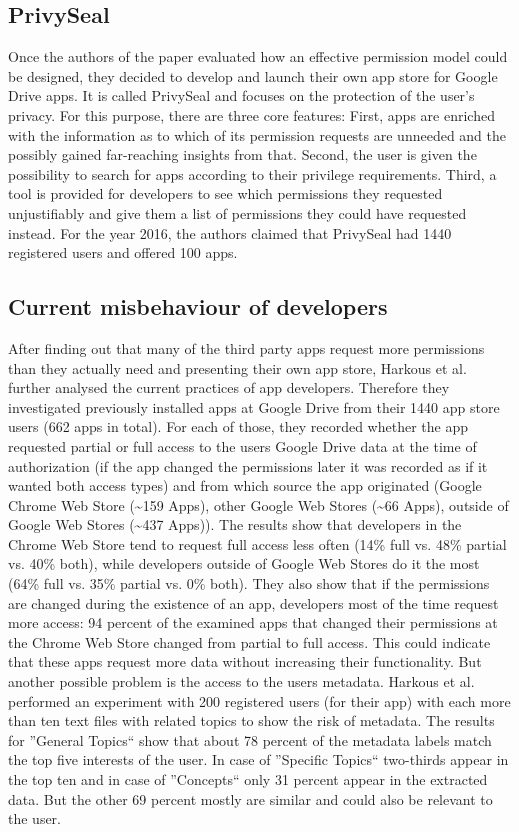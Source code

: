 \documentclass[11pt,twocolumn,a4paper,DIV=calc]{scrartcl}
\begin{document}
\subsection{PrivySeal} 
Once the authors of the paper evaluated how an effective permission model could be designed, they decided to develop and launch their own app store for Google Drive apps. It is called PrivySeal and focuses on the protection of the user's privacy. For this purpose, there are three core features: First, apps are enriched with the information as to which of its permission requests are unneeded and the possibly gained far-reaching insights from that. Second, the user is given the possibility to search for apps according to their privilege requirements. Third, a tool is provided for developers to see which permissions they requested unjustifiably and give them a list of permissions they could have requested instead. For the year 2016, the authors claimed that PrivySeal had 1440 registered users and offered 100 apps. 
\subsection{Current misbehaviour of developers}
After finding out that many of the third party apps request more permissions than they actually need and presenting their own app store, Harkous et al. further analysed the current practices of app developers. Therefore they investigated previously installed apps at Google Drive from their 1440 app store users (662 apps in total). For each of those, they recorded whether the app requested partial or full access to the users Google Drive data at the time of authorization (if the app changed the permissions later it was recorded as if it wanted both access types) and from which source the app originated (Google Chrome Web Store (\textasciitilde 159 Apps), other Google Web Stores (\textasciitilde 66 Apps), outside of Google Web Stores (\textasciitilde 437 Apps)). 
The results show that developers in the Chrome Web Store tend to request full access less often (14\% full vs. 48\% partial vs. 40\% both), while developers outside of Google Web Stores do it the most (64\% full vs. 35\% partial vs. 0\% both). They also show that if the permissions are changed during the existence of an app, developers most of the time request more access: 94 percent of the examined apps that changed their permissions at the Chrome Web Store changed from partial to full access. This could indicate that these apps request more data without increasing their functionality. But another possible problem is the access to the users metadata. Harkous et al. performed an experiment with 200 registered users (for their app) with each more than ten text files with related topics to show the risk of metadata. The results for ''General Topics`` show that about 78 percent of the metadata labels match the top five interests of the user. In case of ''Specific Topics`` two-thirds appear in the top ten and in case of ''Concepts`` only 31 percent appear in the extracted data. But the other 69 percent mostly are similar and could also be relevant to the user. 
\end{document}
